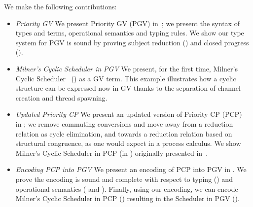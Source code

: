 \documentclass[main.tex]{subfiles}
\begin{document}
We make the following contributions:
\begin{itemize}
\item \emph{Priority GV} We present Priority GV (PGV) in~; we present the syntax of types and terms, operational semantics and typing rules. We show our type system for PGV is sound by proving subject reduction () and closed progress ().
\item \emph{Milner's Cyclic Scheduler in PGV} We present, for the first time, Milner's Cyclic Scheduler~\cite{milner89} () as a GV term. This example illustrates how a cyclic structure can be expressed now in GV thanks to the separation of channel creation and thread spawning.
\item \emph{Updated Priority CP} We present an updated version of Priority CP (PCP)~\cite{dardhagay18} in ; we remove commuting conversions and move away from a reduction relation as cycle elimination, and towards a reduction relation based on structural congruence, as one would expect in a process calculus. We show Milner's Cyclic Scheduler in PCP (in ) originally presented in~\cite{dardhagay18}.
\item \emph{Encoding PCP into PGV} We present an encoding of PCP into PGV in . We prove the encoding is sound and complete with respect to typing () and operational semantics ( and ). Finally, using our encoding, we can encode Milner's Cyclic Scheduler in PCP () resulting in the Scheduler in PGV ().
\end{itemize}
\end{document}
